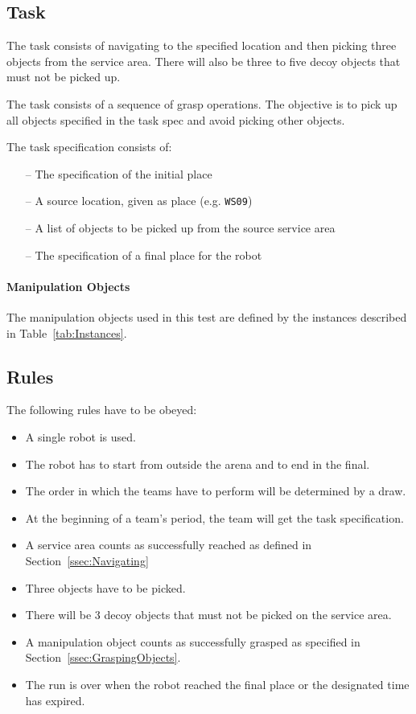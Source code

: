 \subsection{Task}
The task consists of navigating to the specified location and then
picking three objects from the service area. There will also be three to five decoy objects that must not be picked up.
\par
The task consists of a sequence of grasp operations. The objective is to pick up all objects specified in the task spec and avoid picking other objects.
\par
The task specification consists of:
\begin{itemize}
	\item[--] The specification of the initial place
	\item[--] A source location, given as place (e.g. \texttt{WS09})
	\item[--] A list of objects to be picked up from the source service area
	\item[--] The specification of a final place for the robot
\end{itemize}


\paragraph{Manipulation Objects}
The manipulation objects used in this test are defined by the instances described in Table~\ref{tab:Instances}.


\subsection{Rules}
The following rules have to be obeyed:

\begin{itemize}
\item A single robot is used.
\item The robot has to start from outside the arena and to end in the final.
\item The order in which the teams have to perform will be determined by a draw.
\item At the beginning of a team's period, the team will get the task specification.
\item A service area counts as successfully reached as defined in Section~\ref{ssec:Navigating}
\item Three objects have to be picked.
\item There will be 3 decoy objects that must not be picked on the service area.
\item A manipulation object counts as successfully grasped as specified in Section~\ref{ssec:GraspingObjects}.
\item The run is over when the robot reached the final place or the designated time has expired.
\end{itemize}

